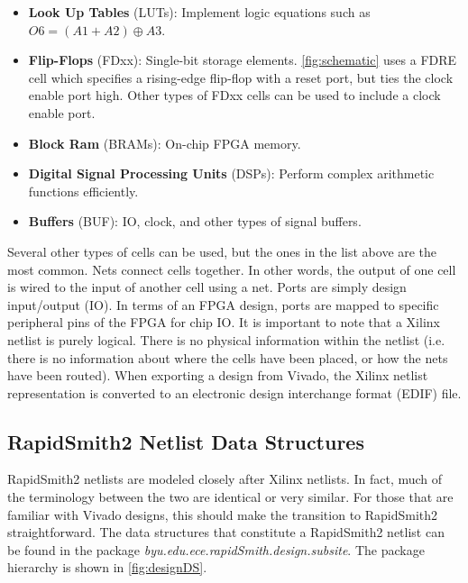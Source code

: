 \begin{itemize}
  \item \textbf{Look Up Tables} (LUTs): Implement logic equations such as
  $O6 = (A1 + A2) \oplus A3$.
  \item \textbf{Flip-Flops} (FDxx): Single-bit storage elements.
  \autoref{fig:schematic} uses a FDRE cell which specifies a rising-edge
  flip-flop with a reset port, but ties the clock enable port high. Other
  types of FDxx cells can be used to include a clock enable port.
  \item \textbf{Block Ram} (BRAMs): On-chip FPGA memory.
  \item \textbf{Digital Signal Processing Units} (DSPs): Perform complex arithmetic
  functions efficiently.
  \item \textbf{Buffers} (BUF): IO, clock, and other types of signal buffers. 
\end{itemize}

\noindent
Several other types of cells can be used, but the ones in the list above
are the most common. Nets connect cells together. In
other words, the output of one cell is wired to the input of another
cell using a net. Ports are simply design input/output (IO). In terms of an FPGA
design, ports are mapped to specific peripheral pins of the FPGA
for chip IO. It is important to note that a Xilinx netlist is purely logical.
There is no physical information within the netlist (i.e. there is no information about
where the cells have been placed, or how the nets have been routed). When
exporting a design from Vivado, the Xilinx netlist representation is converted
to an electronic design interchange format (EDIF) file.

\subsection {RapidSmith2 Netlist Data Structures} \label{sec:designDS}
RapidSmith2 netlists are modeled closely after Xilinx netlists. In fact,
much of the terminology between the two are identical or very similar. For those
that are familiar with Vivado designs, this should make the transition to
RapidSmith2 straightforward. The data structures that constitute a RapidSmith2
netlist can be found in the package
\textit{byu.edu.ece.rapidSmith.design.subsite}.
The package hierarchy is shown in \autoref{fig:designDS}.

